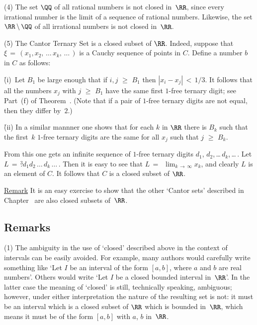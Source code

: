 \V

        (4) The set ${\QQ}$ of all rational numbers is not closed in~${\RR}$, since every irrational number is the limit of a sequence of rational numbers.
    Likewise, the set ${\RR}\,{\setminus}\,{\QQ}$ of all irrational  numbers is not closed in~${\RR}$.

\V

        (5) The Cantor Ternary Set is a closed subset of ${\RR}$.
    Indeed, suppose that ${\xi} \,=\, (x_{1},x_{2},\,{\ldots}\,x_{k},\,{\ldots}\,)$ is a Cauchy sequence of points in $C$.
    Define a number $b$ in $C$ as follows:

        \h (i)\, Let $B_{1}$ be large enough that if $i,j\,\,{\geq}\,\,B_{1}$ then $|x_{i}-x_{j}|\,<\,1/3$.
    It follows that all the numbers $x_{j}$ with $j\,\,{\geq}\,\,B_{1}$ have the same first $1$-free ternary digit; see Part~(f) of Theorem~.
    (Note that if a pair of $1$-free ternary digits are not equal, then they differ by~$2$.)

        \h (ii) In a similar mannner one shows that for each $k$ in ${\RR}$ there is $B_{k}$ such that the first~$k$ $1$-free ternary digits are the same for all $x_{j}$ such that $j\,\,{\geq}\,\,B_{k}$.

        From this one gets an infinite sequence of $1$-free ternary digits $d_{1}$, $d_{2}$,\,{\ldots}\,$d_{k}$,\,{\ldots}\,.
    Let $L \,=\,  \stackrel{3}{.}d_{1}d_{2}\,{\ldots}\,d_{k}\,{\ldots}\,$.
    Then it is easy to see that $L \,=\,$ $\lim_{k \,{\rightarrow}\, {\infty}} x_{k}$, and clearly $L$ is an element of $C$.
    It follows that $C$ is a closed subset of ${\RR}$.

        \underline{Remark} It is an easy exercise to show that the other `Cantor sets' described in Chapter~ are also closed subsets of~${\RR}$.



\VV

            \subsection{\small{\bf Remarks}}
            \label{RemrkC80.30}

        \hspace*{\parindent}(1) The ambiguity in the use of `closed' described above in the context of intervals can be easily avoided.
    For example, many authors would carefully write something like `Let $I$ be an interval of the form $[a,b]$, where $a$ and $b$ are real numbers'.
    Others would write `Let $I$ be a closed bounded interval in~${\RR}$'. In the latter case the meaning of `closed' is still, technically speaking, ambiguous;
    however, under either interpretation the nature of the resulting set is not: it must be
    an interval which is a closed subset of ${\RR}$ which is bounded in~${\RR}$, which means it must be of the form $[a,b]$ with $a$, $b$ in~${\RR}$.


